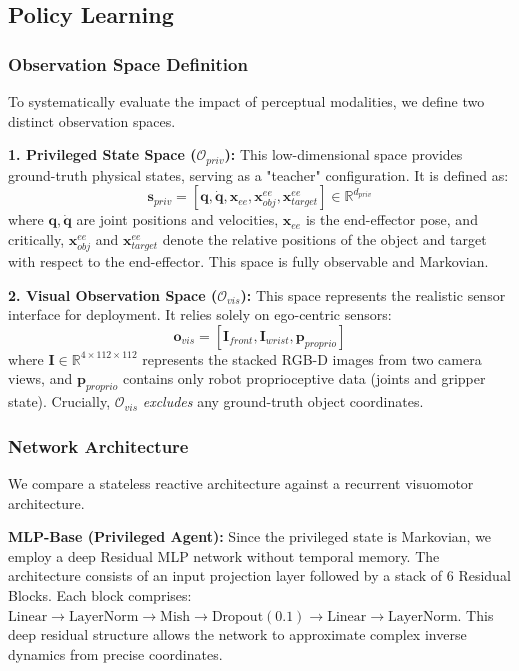 \documentclass{article} %
\begin{document}
\subsection{Policy Learning}
\label{sec:policy_learning}

\subsubsection{Observation Space Definition}
To systematically evaluate the impact of perceptual modalities, we define two distinct observation spaces.

{\bfseries 1. Privileged State Space ($\mathcal{O}_{priv}$):} 
This low-dimensional space provides ground-truth physical states, serving as a "teacher" configuration. It is defined as:
\begin{equation}
    \mathbf{s}_{priv} = [\mathbf{q}, \dot{\mathbf{q}}, \mathbf{x}_{ee}, \mathbf{x}_{obj}^{ee}, \mathbf{x}_{target}^{ee}] \in \mathbb{R}^{d_{priv}}
\end{equation}
where $\mathbf{q}, \dot{\mathbf{q}}$ are joint positions and velocities, $\mathbf{x}_{ee}$ is the end-effector pose, and critically, $\mathbf{x}_{obj}^{ee}$ and $\mathbf{x}_{target}^{ee}$ denote the relative positions of the object and target with respect to the end-effector. This space is fully observable and Markovian.

{\bfseries 2. Visual Observation Space ($\mathcal{O}_{vis}$):} 
This space represents the realistic sensor interface for deployment. It relies solely on ego-centric sensors:
\begin{equation}
    \mathbf{o}_{vis} = [\mathbf{I}_{front}, \mathbf{I}_{wrist}, \mathbf{p}_{proprio}]
\end{equation}
where $\mathbf{I} \in \mathbb{R}^{4 \times 112 \times 112}$ represents the stacked RGB-D images from two camera views, and $\mathbf{p}_{proprio}$ contains only robot proprioceptive data (joints and gripper state). Crucially, $\mathcal{O}_{vis}$ \textit{excludes} any ground-truth object coordinates.

\subsubsection{Network Architecture}
We compare a stateless reactive architecture against a recurrent visuomotor architecture.

{\bfseries MLP-Base (Privileged Agent):} 
Since the privileged state is Markovian, we employ a deep Residual MLP network without temporal memory. The architecture consists of an input projection layer followed by a stack of 6 Residual Blocks. Each block comprises: $\text{Linear} \to \text{LayerNorm} \to \text{Mish} \to \text{Dropout}(0.1) \to \text{Linear} \to \text{LayerNorm}$. This deep residual structure allows the network to approximate complex inverse dynamics from precise coordinates.
\end{document}
